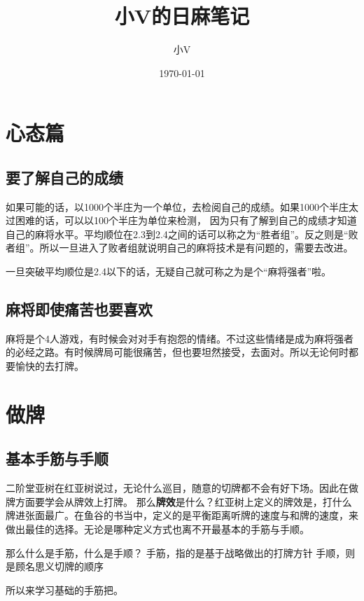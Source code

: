 \documentclass[UTF8,12pt,titlepage,oneside]{ctexbook}
\title{小V的日麻笔记}
\author{小V}
\date{\today}
\begin{document}
\maketitle
\pagestyle{empty}
\tableofcontents

\pagestyle{fancy}
\chapter{心态篇}
\section{要了解自己的成绩}
如果可能的话，以1000个半庄为一个单位，去检阅自己的成绩。如果1000个半庄太过困难的话，可以以100个半庄为单位来检测， 因为只有了解到自己的成绩才知道自己的麻将水平。平均顺位在2.3到2.4之间的话可以称之为“胜者组”。反之则是“败者组”。所以一旦进入了败者组就说明自己的麻将技术是有问题的，需要去改进。

一旦突破平均顺位是2.4以下的话，无疑自己就可称之为是个“麻将强者”啦。

\section{麻将即使痛苦也要喜欢}
麻将是个4人游戏，有时候会对对手有抱怨的情绪。不过这些情绪是成为麻将强者的必经之路。有时候牌局可能很痛苦，但也要坦然接受，去面对。所以无论何时都要愉快的去打牌。


\cleardoublepage
\chapter{做牌}
\section{基本手筋与手顺}
二阶堂亚树在红亚树说过，无论什么巡目，随意的切牌都不会有好下场。因此在做牌方面要学会从牌效上打牌。
那么\textbf{牌效}是什么？红亚树上定义的牌效是，打什么牌进张面最广。在鱼谷的书当中，定义的是平衡距离听牌的速度与和牌的速度，来做出最佳的选择。无论是哪种定义方式也离不开最基本的手筋与手顺。

那么什么是手筋，什么是手顺？
手筋，指的是基于战略做出的打牌方针
手顺，则是顾名思义切牌的顺序

所以来学习基础的手筋把。
\end{document}
